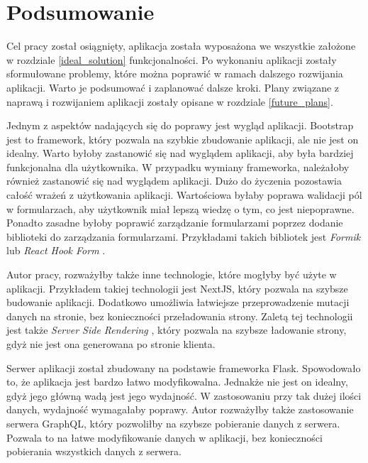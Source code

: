 \section{Podsumowanie}\label{summary}
Cel pracy został osiągnięty, aplikacja została wyposażona we wszystkie założone w rozdziale \ref{ideal_solution} funkcjonalności. Po wykonaniu aplikacji zostały sformułowane problemy, które można poprawić w ramach dalszego rozwijania aplikacji. Warto je podsumować i zaplanować dalsze kroki. Plany związane z naprawą i rozwijaniem aplikacji zostały opisane w rozdziale \ref{future_plans}.

Jednym z aspektów nadających się do poprawy jest wygląd aplikacji. Bootstrap jest to framework, który pozwala na szybkie zbudowanie aplikacji, ale nie jest on idealny. Warto byłoby zastanowić się nad wyglądem aplikacji, aby była bardziej funkcjonalna dla użytkownika. W przypadku wymiany frameworka, należałoby również zastanowić się nad wyglądem aplikacji. Dużo do życzenia pozostawia całość wrażeń z użytkowania aplikacji. Wartościowa byłaby poprawa walidacji pól w formularzach, aby użytkownik miał lepszą wiedzę o tym, co jest niepoprawne. Ponadto zasadne byłoby poprawić zarządzanie formularzami poprzez dodanie biblioteki do zarządzania formularzami. Przykładami takich bibliotek jest \textit{Formik} \cite{Formik} lub \textit{React Hook Form} \cite{React_hook_form}.

Autor pracy, rozważyłby także inne technologie, które mogłyby być użyte w aplikacji. Przykładem takiej technologii jest NextJS, który pozwala na szybsze budowanie aplikacji. Dodatkowo umożliwia łatwiejsze przeprowadzenie mutacji danych na stronie, bez konieczności przeładowania strony. Zaletą tej technologii jest także \textit{Server Side Rendering} \cite{SSR}, który pozwala na szybsze ładowanie strony, gdyż nie jest ona generowana po stronie klienta.

Serwer aplikacji został zbudowany na podstawie frameworka Flask. Spowodowało to, że aplikacja jest bardzo łatwo modyfikowalna. Jednakże nie jest on idealny, gdyż jego główną wadą jest jego wydajność. W zastosowaniu przy tak dużej ilości danych, wydajność wymagałaby poprawy. Autor rozważyłby także zastosowanie serwera GraphQL, który pozwoliłby na szybsze pobieranie danych z serwera. Pozwala to na łatwe modyfikowanie danych w aplikacji, bez konieczności pobierania wszystkich danych z serwera.

